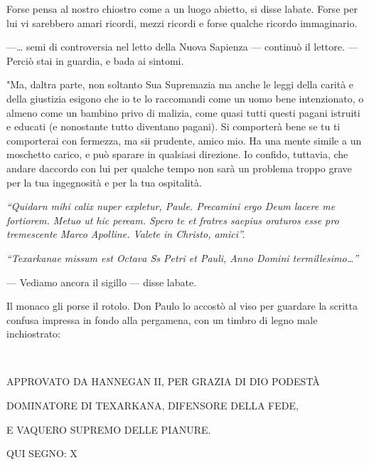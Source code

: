 Forse pensa al nostro chiostro come a un luogo abietto, si disse
l\textquotesingle abate. Forse per lui vi sarebbero amari ricordi, mezzi
ricordi e forse qualche ricordo immaginario.

---\ldots{} semi di controversia nel letto della Nuova Sapienza ---
continuò il lettore. --- Perciò stai in guardia, e bada ai sintomi.

"Ma, d\textquotesingle altra parte, non soltanto Sua Supremazia ma anche
le leggi della carità e della giustizia esigono che io te lo raccomandi
come un uomo bene intenzionato, o almeno come un bambino privo di
malizia, come quasi tutti questi pagani istruiti e educati (e nonostante
tutto diventano pagani). Si comporterà bene se tu ti comporterai con
fermezza, ma sii prudente, amico mio. Ha una mente simile a un moschetto
carico, e può sparare in qualsiasi direzione. Io confido, tuttavia, che
andare d\textquotesingle accordo con lui per qualche tempo non sarà un
problema troppo grave per la tua ingegnosità e per la tua ospitalità.

\emph{``Quidarn mihi calix nuper expletur, Paule. Precamini ergo Deum
	lacere me fortiorem. Metuo ut hic peream. Spero te et fratres saepius
	oraturos esse pro tremescente Marco Apolline. Valete in Christo,
	amici''.}

\emph{``Texarkanae missum est Octava Ss Petri et Pauli, Anno Domini
	termillesimo\ldots''}

--- Vediamo ancora il sigillo --- disse l\textquotesingle abate.

Il monaco gli porse il rotolo. Don Paulo lo accostò al viso per guardare
la scritta confusa impressa in fondo alla pergamena, con un timbro di
legno male inchiostrato:

~
\begin{center}
	{\large{APPROVATO DA HANNEGAN II, PER GRAZIA DI DIO PODESTÀ}}
\end{center}

\begin{center}
	{\large{DOMINATORE DI TEXARKANA, DIFENSORE DELLA FEDE,}}
\end{center}

\begin{center}
	{\large{E VAQUERO SUPREMO DELLE PIANURE.}}
\end{center}

\begin{center}
	{\large{QUI SEGNO: X}}
\end{center}

~


